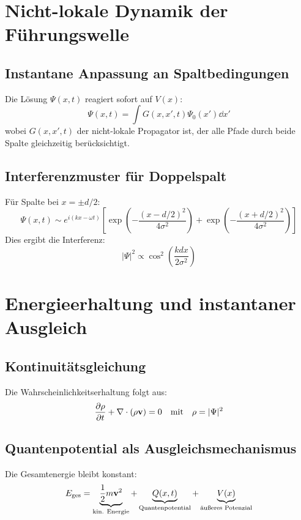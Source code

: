 \documentclass[12pt]{article}
\begin{document}
\section{Nicht-lokale Dynamik der Führungswelle}

\subsection{Instantane Anpassung an Spaltbedingungen}
Die Lösung $\Psi(x,t)$ reagiert sofort auf $V(x)$:
\begin{equation}
\Psi(x,t) = \int G(x,x',t) \Psi_0(x') \dd{x'}
\end{equation}
wobei $G(x,x',t)$ der nicht-lokale Propagator ist, der alle Pfade durch beide Spalte gleichzeitig berücksichtigt.

\subsection{Interferenzmuster für Doppelspalt}
Für Spalte bei $x = \pm d/2$:
\begin{equation}
\Psi(x,t) \sim e^{i(kx-\omega t)} \left[ \exp\left( -\frac{(x-d/2)^2}{4\sigma^2} \right) + \exp\left( -\frac{(x+d/2)^2}{4\sigma^2} \right) \right]
\end{equation}
Dies ergibt die Interferenz:
\begin{equation}
|\Psi|^2 \propto \cos^2\left( \frac{kdx}{2\sigma^2} \right)
\end{equation}

\section{Energieerhaltung und instantaner Ausgleich}

\subsection{Kontinuitätsgleichung}
Die Wahrscheinlichkeitserhaltung folgt aus:
\begin{equation}
\pdv{\rho}{t} + \nabla \cdot (\rho \vb{v}) = 0 \quad \text{mit} \quad \rho = |\Psi|^2
\end{equation}

\subsection{Quantenpotential als Ausgleichsmechanismus}
Die Gesamtenergie bleibt konstant:
\begin{equation}
E_{\text{ges}} = \underbrace{\frac{1}{2}m\vb{v}^2}_{\text{kin. Energie}} + \underbrace{Q(x,t)}_{\text{Quantenpotential}} + \underbrace{V(x)}_{\text{äußeres Potenzial}}
\end{equation}
\end{document}
